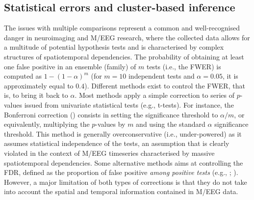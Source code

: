 \documentclass[
  doc,
  floatsintext,
  longtable,
  a4paper,
  nolmodern,
  notxfonts,
  notimes,
  colorlinks=true,linkcolor=blue,citecolor=blue,urlcolor=blue]{apa7}
\begin{document}
\subsection{Statistical errors and cluster-based
inference}\label{statistical-errors-and-cluster-based-inference}

The issues with multiple comparisons represent a common and
well-recognised danger in neuroimaging and M/EEG research, where the
collected data allows for a multitude of potential hypothesis tests and
is characterised by complex structures of spatiotemporal dependencies.
The probability of obtaining at least one false positive in an ensemble
(family) of \(m\) tests (i.e., the FWER) is computed as
\(1-\left(1-\alpha\right)^{m}\) (for \(m=10\) independent tests and
\(\alpha=0.05\), it is approximately equal to \(0.4\)). Different
methods exist to control the FWER, that is, to bring it back to
\(\alpha\). Most methods apply a simple correction to series of
\(p\)-values issued from univariate statistical tests (e.g., t-tests).
For instance, the Bonferroni correction () consists in setting the significance threshold to \(\alpha/m\),
or equivalently, multiplying the \(p\)-values by \(m\) and using the
standard \(\alpha\) significance threshold. This method is generally
overconservative (i.e., under-powered) as it assumes statistical
independence of the tests, an assumption that is clearly violated in the
context of M/EEG timeseries characterised by massive spatiotemporal
dependencies. Some alternative methods aims at controlling the FDR,
defined as the proportion of false positive \emph{among positive tests}
(e.g., ;
). However, a
major limitation of both types of corrections is that they do not take
into account the spatial and temporal information contained in M/EEG
data.
\end{document}
